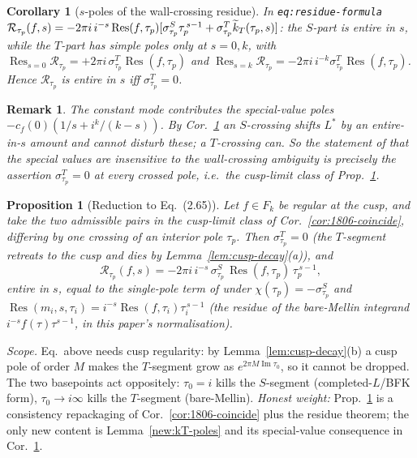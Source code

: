 \documentclass[11pt]{article}
\newtheorem{proposition}{Proposition}\newtheorem{corollary}{Corollary}
\newtheorem{remark}{Remark}
\DeclareMathOperator{\Res}{Res}\DeclareMathOperator{\im}{Im}
\begin{document}
\begin{corollary}[$s$-poles of the wall-crossing residue]\label{new:R-poles}
In \texttt{eq:residue-formula}
$\mathcal R_{\tau_p}(f,s)=-2\pi i\,i^{-s}\Res(f,\tau_p)
[\sigma^S_{\tau_p}\tau_p^{\,s-1}+\sigma^T_{\tau_p}\ktil(\tau_p,s)]$:
the $S$-part is entire in $s$, while the $T$-part has simple poles only
at $s=0,k$, with
$\Res_{s=0}\mathcal R_{\tau_p}=+2\pi i\,\sigma^T_{\tau_p}\Res(f,\tau_p)$
and
$\Res_{s=k}\mathcal R_{\tau_p}=-2\pi i\,i^{-k}\sigma^T_{\tau_p}\Res(f,\tau_p)$.
Hence $\mathcal R_{\tau_p}$ is entire in $s$ iff $\sigma^T_{\tau_p}=0$.
\end{corollary}

\begin{remark}
The constant mode contributes the special-value poles
$-c_f(0)(1/s+i^k/(k-s))$. By Cor.~\ref{new:R-poles} an $S$-crossing
shifts $L^*$ by an entire-in-$s$ amount and cannot disturb these; a
$T$-crossing can. So the statement of \cite[\S2.4]{1806} that the
special values are insensitive to the wall-crossing ambiguity is
precisely the assertion $\sigma^T_{\tau_p}=0$ at every crossed pole,
i.e.\ the cusp-limit class of Prop.~\ref{new:reduction}.
\end{remark}

\begin{proposition}[Reduction to \cite{1806} Eq.~(2.65)]\label{new:reduction}
Let $f\in F_k$ be regular at the cusp, and take the two admissible
pairs in the cusp-limit class of Cor.~\ref{cor:1806-coincide},
differing by one crossing of an interior pole $\tau_p$. Then
$\sigma^T_{\tau_p}=0$ (the $T$-segment retreats to the cusp and dies by
Lemma~\ref{lem:cusp-decay}(a)), and
\[
  \mathcal R_{\tau_p}(f,s)
  = -2\pi i\,i^{-s}\,\sigma^S_{\tau_p}\,\Res(f,\tau_p)\,\tau_p^{\,s-1},
\]
entire in $s$, equal to the single-pole term of \cite[Eq.~(2.65)]{1806}
under $\chi(\tau_p)=-\sigma^S_{\tau_p}$ and
$\Res(m_i,s,\tau_i)=i^{-s}\Res(f,\tau_i)\tau_i^{\,s-1}$ (the residue of
the bare-Mellin integrand $i^{-s}f(\tau)\tau^{s-1}$, in this paper's
normalisation).
\end{proposition}

\noindent\emph{Scope.} Eq.\ above needs cusp regularity: by
Lemma~\ref{lem:cusp-decay}(b) a cusp pole of order $M$ makes the
$T$-segment grow as $e^{2\pi M\im\tau_0}$, so it cannot be dropped. The
two basepoints act oppositely: $\tau_0=i$ kills the $S$-segment
(completed-$L$/BFK form), $\tau_0\to i\infty$ kills the $T$-segment
(bare-Mellin). \emph{Honest weight:} Prop.~\ref{new:reduction} is a
consistency repackaging of Cor.~\ref{cor:1806-coincide} plus the
residue theorem; the only new content is Lemma~\ref{new:kT-poles} and
its special-value consequence in Cor.~\ref{new:R-poles}.
\end{document}
